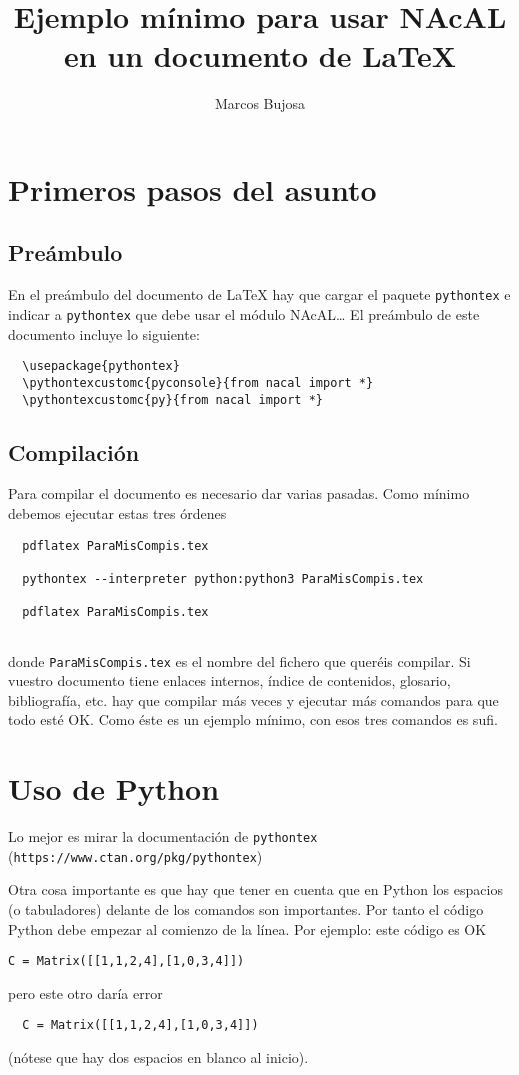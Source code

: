 \documentclass[12pt,a4paper]{article} %
\title{Ejemplo mínimo para usar NAcAL en un documento de \LaTeX{}}
\author{Marcos Bujosa}
\begin{document}
\maketitle
\section{Primeros pasos del asunto}

\subsection{Preámbulo}

En el preámbulo del documento de \LaTeX{} hay que cargar el paquete
\texttt{pythontex} e indicar a \texttt{pythontex} que debe usar el
módulo NAcAL\dots{} El preámbulo de este documento incluye lo
siguiente:
\begin{Verbatim}
  \usepackage{pythontex}
  \pythontexcustomc{pyconsole}{from nacal import *}
  \pythontexcustomc{py}{from nacal import *}
\end{Verbatim}

\subsection{Compilación}
Para compilar el documento es necesario dar varias pasadas. Como
mínimo debemos ejecutar estas tres órdenes
\begin{Verbatim}
  pdflatex ParaMisCompis.tex
  
  pythontex --interpreter python:python3 ParaMisCompis.tex
  
  pdflatex ParaMisCompis.tex
  
\end{Verbatim}
donde \texttt{ParaMisCompis.tex} es el nombre del fichero que queréis
compilar. Si vuestro documento tiene enlaces internos, índice de
contenidos, glosario, bibliografía, etc. hay que compilar más veces y
ejecutar más comandos para que todo esté OK. Como éste es un ejemplo
mínimo, con esos tres comandos es sufi.


\section{Uso de Python}
Lo mejor es mirar la documentación de \texttt{pythontex}\\
(\texttt{https://www.ctan.org/pkg/pythontex})
\medskip

Otra cosa importante es que hay que tener en cuenta que en Python los
espacios (o tabuladores) delante de los comandos son importantes. Por
tanto el código Python debe empezar al comienzo de la línea. Por
ejemplo: este código es OK
\begin{Verbatim}
C = Matrix([[1,1,2,4],[1,0,3,4]])  
\end{Verbatim}
pero este otro daría error
\begin{Verbatim}
  C = Matrix([[1,1,2,4],[1,0,3,4]])  
\end{Verbatim}
(nótese que hay dos espacios en blanco al inicio).  \medskip
\end{document}
